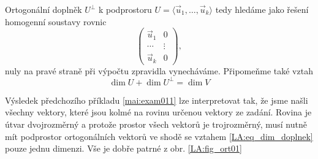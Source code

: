       Ortogonální doplněk \(U^\bot\) k podprostoru \(U = \langle\vec{u}_1,\ldots,\vec{u}_k\rangle\) 
      tedy hledáme jako řešení homogenní soustavy rovnic
      \begin{equation*}
        \left(
          \begin{array}{c|c}
             \vec{u}_1  &   0      \\
             \cdots     &  \vdots  \\
             \vec{u}_k  &   0
          \end{array}
        \right),
      \end{equation*}
      nuly na pravé straně při výpočtu zpravidla vynecháváme. Připomeňme také vztah
      \begin{equation}\label{LA:eq_dim_doplnek}
         \dim U + \dim U^\bot = \dim V
      \end{equation}

        
  
      Výsledek předchozího příkladu \ref{mai:exam011} lze interpretovat tak, že jsme našli všechny 
      vektory, které jsou kolmé na rovinu určenou vektory ze zadání. Rovina je útvar       
      dvojrozměrný a protože prostor všech vektorů je trojrozměrný, musí nutně mít podprostor 
      ortogonálních vektorů ve shodě se vztahem \ref{LA:eq_dim_doplnek} pouze jednu dimenzi. Vše 
      je dobře patrné z obr. \ref{LA:fig_ort01}

              